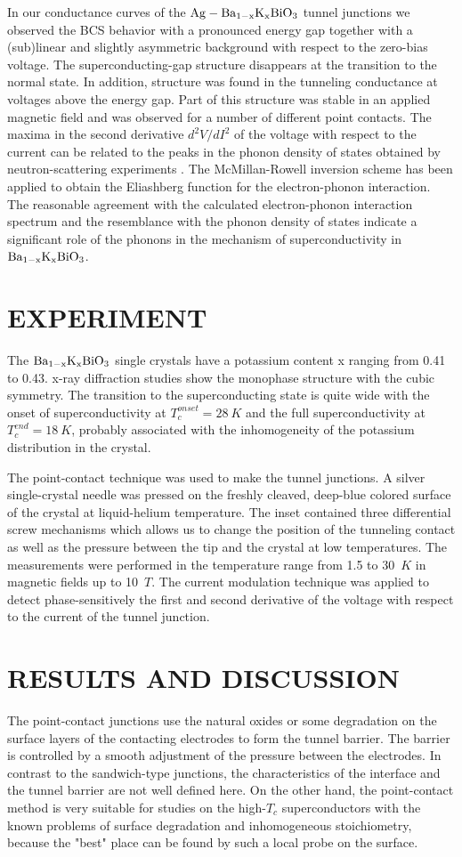 \documentclass[twocolumn,amsmath,floats,showpacs,nofootinbib]{revtex4}
\begin{document}
In our conductance curves of the $\rm Ag-Ba_{1-x}K_xBiO_3$ tunnel junctions we observed the BCS behavior with a pronounced energy gap together with a (sub)linear and slightly asymmetric background with respect to the zero-bias voltage. The superconducting-gap structure disappears at the transition to the normal state. In addition, structure was found in the tunneling conductance at voltages above the energy gap. Part of this structure was stable in an applied magnetic field and was observed for a number of different point contacts. The maxima in the second derivative $d^2V/dI^2$ of the voltage with respect to the current can be related to the peaks in the phonon density of states obtained by neutron-scattering experiments \cite{13}. The McMillan-Rowell inversion scheme has been applied to obtain the Eliashberg function for the electron-phonon interaction. The reasonable agreement with the calculated electron-phonon interaction spectrum and the resemblance with the phonon density of states indicate a significant role of the phonons in the mechanism of superconductivity in $\rm Ba_{1-x}K_xBiO_3$.
\section{EXPERIMENT}
The $\rm Ba_{1-x}K_xBiO_3$ single crystals have a potassium content x ranging from 0.41 to 0.43. x-ray diffraction studies show the monophase structure with the cubic symmetry. The transition to the superconducting state is quite wide with the onset of superconductivity at $T_c^{onset}=28\ K$ and the full superconductivity at $T_c^{end}= 18\ K$, probably associated with the inhomogeneity of the potassium distribution in the crystal.

The point-contact technique was used to make the tunnel junctions. A silver single-crystal needle was pressed on the freshly cleaved, deep-blue colored surface of the crystal at liquid-helium temperature. The inset contained three differential screw mechanisms which allows us to change the position of the tunneling contact as well as the pressure between the tip and the crystal at low temperatures. The measurements were performed in the temperature range from 1.5 to 30~$K$ in magnetic fields up to 10~$T$. The current modulation technique was applied to detect phase-sensitively the first and second derivative of the voltage with respect to the current of the tunnel junction.
\section{RESULTS AND DISCUSSION}
The point-contact junctions use the natural oxides or some degradation on the surface layers of the contacting electrodes to form the tunnel barrier. The barrier is controlled by a smooth adjustment of the pressure between the electrodes. In contrast to the sandwich-type junctions, the characteristics of the interface and the tunnel barrier are not well defined here. On the other hand, the point-contact method is very suitable for studies on the high-$T_c$ superconductors with the known problems of surface degradation and inhomogeneous stoichiometry, because the "best" place can be found by such a local probe on the surface.
\end{document}
